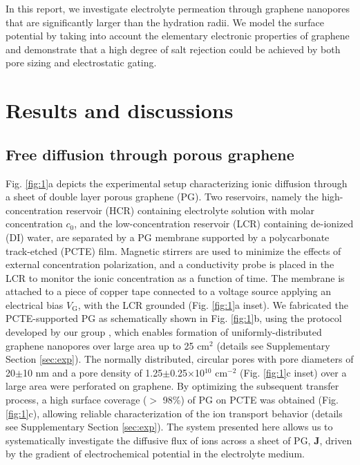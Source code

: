 \documentclass[journal=langd5,email=true, hyperref=true, keywords=false]{achemso}
\begin{document}
In this report, we investigate electrolyte permeation through graphene
nanopores that are significantly larger than the hydration radii. We
model the surface potential by taking into account the elementary
electronic properties of graphene and demonstrate that a high degree
of salt rejection could be achieved by both pore sizing and
electrostatic gating.

\section*{Results and discussions}
\label{sec:res}

\subsection*{Free diffusion through porous graphene}
\label{sec:res-1}

Fig. \ref{fig:1}a depicts the experimental setup characterizing
ionic diffusion through a sheet of double layer porous graphene
(PG). Two reservoirs, namely the high-concentration reservoir (HCR)
containing electrolyte solution with molar concentration $c_0$, and
the low-concentration reservoir (LCR) containing de-ionized (DI)
water, are separated by a PG membrane supported by a polycarbonate
track-etched (PCTE) film. Magnetic stirrers are used to minimize the
effects of external concentration polarization, and a conductivity
probe is placed in the LCR to monitor the ionic concentration as a
function of time. The membrane is attached to a piece of copper tape
connected to a voltage source applying an electrical bias
$V_{\mathrm{G}}$, with the LCR grounded (Fig. \ref{fig:1}a
inset). We fabricated the PCTE-supported PG as schematically shown in
Fig. \ref{fig:1}b, using the protocol developed by our group
\cite{Choi_2018}, which  enables formation of uniformly-distributed graphene  nanopores over large area up
 to 25 cm$^{2}$ (details see Supplementary Section
\ref{sec:exp}). The normally distributed, circular pores with pore
diameters of 20$\pm$10 nm and a pore density of
1.25$\pm$0.25$\times$10$^{10}$ cm$^{-2}$ (Fig. \ref{fig:1}c inset)
over a large area were perforated on graphene.  By optimizing the
subsequent transfer process, a high surface coverage ($>$ 98\%) of PG
on PCTE was obtained (Fig. \ref{fig:1}c), allowing reliable
characterization of the ion transport behavior (details see
Supplementary Section \ref{sec:exp}).  The system presented here
allows us to systematically investigate the diffusive flux of ions
across a sheet of PG, $\boldsymbol{J}$, driven by the gradient of
electrochemical potential in the electrolyte medium.
\end{document}
